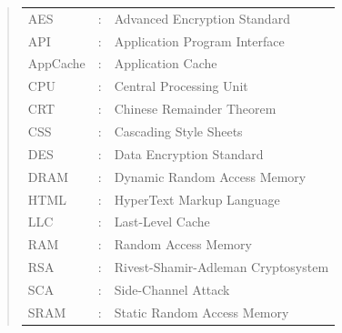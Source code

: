 \documentclass[10pt,a4paper,twoside]{book}
\begin{document}
\begin{quote}
\noindent
\begin{tabular}{lcl}

AES			   	 	&:	   & Advanced Encryption Standard							 \\	
API					&:     & Application Program Interface							 \\
AppCache		   	 	&:	   & Application Cache   									 \\	
CPU					&:	   & Central Processing Unit									 \\
CRT					&:	   & Chinese Remainder Theorem								 \\
CSS					&:	   & Cascading Style Sheets									 \\
DES					&:	   & Data Encryption Standard								 \\
DRAM					&:	   & Dynamic Random Access Memory							 \\
HTML					&:     & HyperText Markup Language								 \\
LLC					&:	   & Last-Level Cache										 \\
RAM					&:	   & Random Access Memory									 \\
RSA					&:	   & Rivest-Shamir-Adleman Cryptosystem				    		 \\
SCA					&:	   & Side-Channel Attack										 \\	
SRAM					&:	   & Static Random Access Memory								 \\
\end{tabular}
\end{quote}

\end{document}
